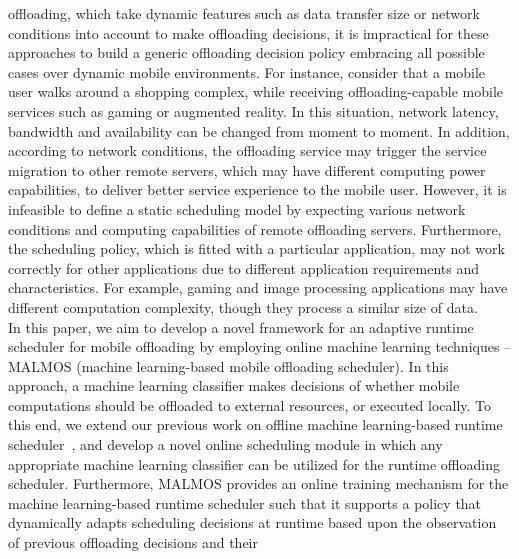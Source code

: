\documentclass[10pt, conference, compsocconf]{IEEEtran}
\begin{document}
offloading, which take dynamic features such as data transfer size or
network conditions into account to make offloading decisions, it is
impractical for these approaches to build a generic offloading decision
policy embracing all possible cases over dynamic mobile environments.
%
For instance, consider that a mobile user walks around a shopping complex, while
receiving offloading-capable mobile services such as gaming or
augmented reality.
%
In this situation, network latency, bandwidth and availability can be changed from
moment to moment.
%
In addition, according to network conditions, the offloading service may
trigger the service migration to other remote servers, which may have
different computing power capabilities, to deliver better service experience
to the mobile user.
%
However, it is infeasible to define a static scheduling model by
expecting various network conditions and computing capabilities of remote
offloading servers.  
%
Furthermore, the scheduling policy, which is fitted with a particular
application, may not work correctly for other applications due to
different application requirements and characteristics.
%
For example, gaming and image processing applications may have different
computation complexity, though they process a similar size of data.\\
%
%
\indent In this paper, we aim to develop a novel framework for an
adaptive runtime scheduler for mobile offloading by employing online
machine learning techniques -- MALMOS (machine learning-based mobile
offloading scheduler).
%
In this approach, a machine learning classifier makes decisions of
whether mobile computations should be offloaded to external resources,
or executed locally. 
%
To this end, we extend our previous work on offline machine
learning-based runtime scheduler~\cite{ml}, and develop a novel online
scheduling module in which any appropriate machine learning classifier
can be utilized for the runtime offloading scheduler.
%
%
Furthermore, MALMOS provides an online training mechanism for
the machine learning-based runtime scheduler such that it supports a
policy that dynamically adapts scheduling decisions at runtime based
upon the observation of previous offloading decisions and their
\end{document}
